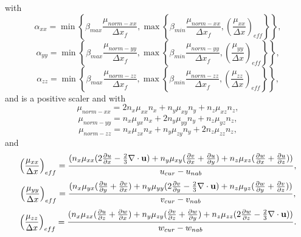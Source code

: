 with
\begin{equation}
\alpha_{xx}=
\min\left\{  \beta_{max}\frac{\mu_{norm-xx}}{{\Delta x}_{f}} , \max\left\{ \beta_{min}\frac{\mu_{norm-xx}}{{\Delta x}_{f}} , 
\left( \frac{\mu_{xx}}{\Delta x} \right)_{eff}
\right\} \right\} , 
\label{dg-alpha-xx-def} 
\end{equation} 
\begin{equation}
\alpha_{yy}=
\min\left\{  \beta_{max}\frac{\mu_{norm-yy}}{{\Delta x}_{f}} , \max\left\{ \beta_{min}\frac{\mu_{norm-yy}}{{\Delta x}_{f}} , 
\left( \frac{\mu_{yy}}{\Delta x} \right)_{eff}
\right\} \right\} , 
\label{dg-alpha-yy-def} 
\end{equation} 
\begin{equation}
\alpha_{zz}=
\min\left\{  \beta_{max}\frac{\mu_{norm-zz}}{{\Delta x}_{f}} , \max\left\{ \beta_{min}\frac{\mu_{norm-zz}}{{\Delta x}_{f}} , 
\left( \frac{\mu_{zz}}{\Delta x} \right)_{eff}
\right\} \right\} , 
\label{dg-alpha-zz-def} 
\end{equation} 
and is a positive scaler and with
\begin{equation}
\mu_{norm-xx}=2n_x \mu_{xx}  n_x + n_y \mu_{xy} n_y + n_z \mu_{xz} n_z, 
\end{equation}
\begin{equation}
\mu_{norm-yy}=n_x \mu_{yx}  n_x + 2n_y \mu_{yy}  n_y + n_z \mu_{yz} n_z, 
\end{equation}
\begin{equation}
\mu_{norm-zz}=n_x \mu_{zx}  n_x + n_y \mu_{zy} n_y + 2n_z \mu_{zz}  n_z, 
\end{equation}
and
\begin{equation}
\left( \frac{\mu_{xx}}{\Delta x} \right)_{eff}=
\frac{
({n_x} \mu_{xx}
(
2\frac{\partial u}{\partial x}
-\frac{2}{3}\nabla\cdot{\bf u} 
)
+
 {n_y} \mu_{xy}
(
\frac{\partial v}{\partial x}+\frac{\partial u}{\partial y})
+
{n_z} \mu_{xz}
(
\frac{\partial w}{\partial x}+\frac{\partial u}{\partial z})
 )
}
{ u_{cur}-u_{nab}}, 
\end{equation}
\begin{equation}
\left( \frac{\mu_{yy}}{\Delta x} \right)_{eff}=
\frac{({n_x} \mu_{yx}
(
\frac{\partial u}{\partial y}+\frac{\partial v}{\partial x}
)
+
{n_y}\mu_{yy}
(
2\frac{\partial v}{\partial y}
-\frac{2}{3}\nabla\cdot{\bf u} 
)
+
{n_z} \mu_{yz}
(
\frac{\partial w}{\partial y}+\frac{\partial v}{\partial z})
 )
}
{ v_{cur}-v_{nab}}, 
\end{equation}
\begin{equation}
\left( \frac{\mu_{zz}}{\Delta x} \right)_{eff}=
\frac{({n_x} \mu_{zx}
(
\frac{\partial u}{\partial z}+\frac{\partial w}{\partial x})
+
{n_y} \mu_{zy}
(
\frac{\partial v}{\partial z}+\frac{\partial w}{\partial y})
+
{n_z} \mu_{zz}
(
2\frac{\partial w}{\partial z}
-\frac{2}{3}\nabla\cdot{\bf u} 
) )
}
{ w_{cur}-w_{nab}}. 
\end{equation}


